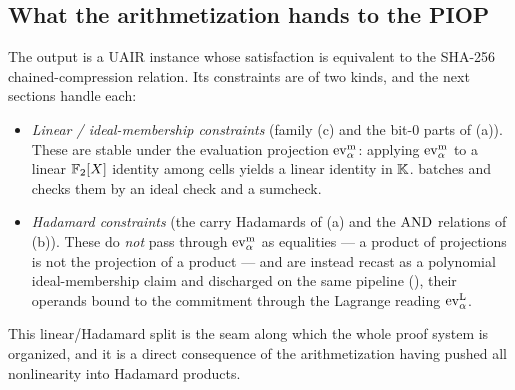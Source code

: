 \subsection{What the arithmetization hands to the PIOP}
\label{sec:arith-handoff}

The output is a UAIR instance whose satisfaction is equivalent to the
SHA-256 chained-compression relation. Its constraints are of two kinds,
and the next sections handle each:
\begin{itemize}[leftmargin=2em]
  \item \emph{Linear / ideal-membership constraints} (family (c) and
    the bit-$0$ parts of (a)). These are stable under the evaluation
    projection $\operatorname{ev}^{\mathrm{m}}_{\alpha}$: applying $\operatorname{ev}^{\mathrm{m}}_{\alpha}$ to a linear $\mathbb{F}_2[X]$ identity
    among cells yields a linear identity in $\mathbb{K}$.  batches
    and checks them by an ideal check and a sumcheck.
  \item \emph{Hadamard constraints} (the carry Hadamards of (a) and the
    $\operatorname{AND}$ relations of (b)). These do \emph{not} pass through $\operatorname{ev}^{\mathrm{m}}_{\alpha}$ as
    equalities --- a product of projections is not the projection of a
    product --- and are instead recast as a polynomial ideal-membership
    claim and discharged on the same pipeline (), their
    operands bound to the commitment through the Lagrange reading $\operatorname{ev}^{\mathrm{L}}_{\alpha}$.
\end{itemize}
This linear/Hadamard split is the seam along which the whole proof system
is organized, and it is a direct consequence of the arithmetization
having pushed all nonlinearity into Hadamard products.
